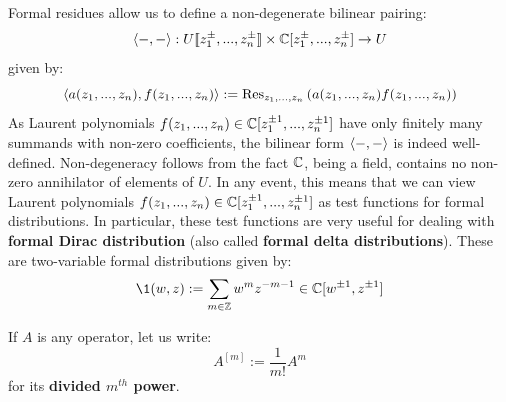         Formal residues allow us to define a non-degenerate bilinear pairing:
            $$\<-, -\>: U[\![z_1^{\pm}, ..., z_n^{\pm}]\!] \x \bbC[z_1^{\pm}, ..., z_n^{\pm}] \to U$$
        given by:
            $$\langle a(z_1, ..., z_n), f(z_1, ..., z_n) \rangle := \mathrm{Res}_{z_1, ..., z_n} \left( a(z_1, ..., z_n) f(z_1, ..., z_n) \right)$$
        As Laurent polynomials $f(z_1, ..., z_n) \in \mathbb{C}[z_1^{\pm 1}, ..., z_n^{\pm 1}]$ have only finitely many summands with non-zero coefficients, the bilinear form $\langle-, -\rangle$ is indeed well-defined. Non-degeneracy follows from the fact $\mathbb{C}$, being a field, contains no non-zero annihilator of elements of $U$. In any event, this means that we can view Laurent polynomials $f(z_1, ..., z_n) \in \mathbb{C}[z_1^{\pm 1}, ..., z_n^{\pm 1}]$ as test functions for formal distributions. In particular, these test functions are very useful for dealing with \textbf{formal Dirac distribution} (also called \textbf{formal delta distributions}). These are two-variable formal distributions given by:
            $$\1(w, z) := \sum_{m \in \Z} w^m z^{-m - 1} \in \bbC[w^{\pm 1}, z^{\pm 1}]$$
        \begin{convention}
            If $A$ is any operator, let us write:
                $$A^{[m]} := \frac{1}{m!} A^m$$
            for its \textbf{divided $m^{th}$ power}.
        \end{convention}
